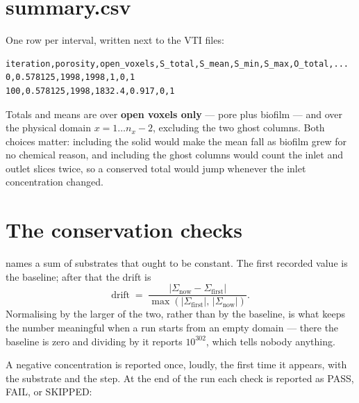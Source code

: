 \section{summary.csv}

One row per interval, written next to the VTI files:

\begin{lstlisting}[style=sh]
iteration,porosity,open_voxels,S_total,S_mean,S_min,S_max,O_total,...
0,0.578125,1998,1998,1,0,1
100,0.578125,1998,1832.4,0.917,0,1
\end{lstlisting}

Totals and means are over \textbf{open voxels only} --- pore plus biofilm --- and
over the physical domain $x = 1 \ldots n_x-2$, excluding the two ghost columns.
Both choices matter: including the solid would make the mean fall as biofilm
grew for no chemical reason, and including the ghost columns would count the
inlet and outlet slices twice, so a conserved total would jump whenever the
inlet concentration changed.

\section{The conservation checks}

 names a sum of substrates that ought to be constant. The first
recorded value is the baseline; after that the drift is
\[
  \text{drift} \;=\; \frac{|\Sigma_{\text{now}} - \Sigma_{\text{first}}|}
                          {\max\!\left(|\Sigma_{\text{first}}|,\,
                                        |\Sigma_{\text{now}}|\right)} .
\]
Normalising by the larger of the two, rather than by the baseline, is what
keeps the number meaningful when a run starts from an empty domain --- there
the baseline is zero and dividing by it reports $10^{302}$, which tells nobody
anything.


A negative concentration is reported once, loudly, the first time it appears,
with the substrate and the step. At the end of the run each check is reported
as PASS, FAIL, or SKIPPED:

